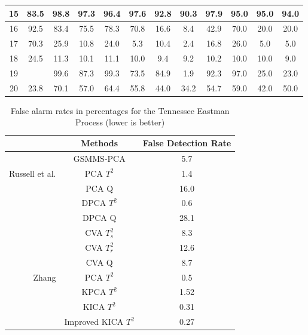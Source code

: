 \begin{table}[htbp]
{\begin{tabular}{c|c|ccccccc|ccc}
    15    & 83.5  & 98.8  & 97.3  & 96.4  & 97.6  & 92.8  & 90.3  & 97.9  & 95.0  & 95.0  & 94.0 \\ \hline
    16    & 92.5  & 83.4  & 75.5  & 78.3  & 70.8  & 16.6  & 8.4   & 42.9  & 70.0  & 20.0  & 20.0 \\
    17    & 70.3  & 25.9  & 10.8  & 24.0  & 5.3   & 10.4  & 2.4   & 16.8  & 26.0  & 5.0   & 5.0 \\
    18    & 24.5  & 11.3  & 10.1  & 11.1  & 10.0  & 9.4   & 9.2   & 10.2  & 10.0  & 10.0  & 9.0 \\
    19    &       & 99.6  & 87.3  & 99.3  & 73.5  & 84.9  & 1.9   & 92.3  & 97.0  & 25.0  & 23.0 \\
    20    & 23.8  & 70.1  & 57.0  & 64.4  & 55.8  & 44.0  & 34.2  & 54.7  & 59.0  & 42.0  & 50.0 \\

    \bottomrule
    \end{tabular}%
    }
  \label{tab:temex_missed}%
\end{table}%



\begin{table}[]
\caption{False alarm rates in percentages for the Tennessee Eastman Process (lower is better)}
{\renewcommand{\arraystretch}{1.2}
\begin{tabular}{r|c|c}
\toprule
& Methods & False Detection Rate \\
\hline

& GSMMS-PCA & 5.7
\\ \hline
Russell et al. \cite{Russell2000} & PCA $T^2$ & 1.4 \\
& PCA Q & 16.0 \\
& DPCA $T^2$ & 0.6 \\
& DPCA Q & 28.1 \\
& CVA $T_s^2$ & 8.3 \\
& CVA $T_r^2$ & 12.6 \\
& CVA Q & 8.7 \\ \hline

Zhang \cite{Zhang2008a}& PCA $T^2$ & 0.5 \\
& KPCA $T^2$ & 1.52 \\
& KICA $T^2$ & 0.31 \\
& Improved KICA $T^2$ & 0.27 \\
\bottomrule
\end{tabular}
} \label{tab:temex_false}
\end{table}
